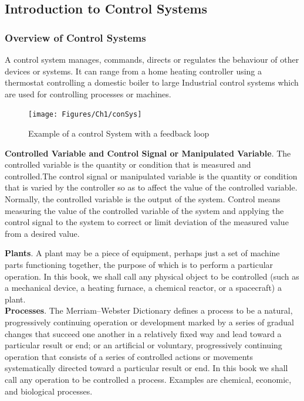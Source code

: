 \documentclass{beamer}
\begin{document}

\subsection{Introduction to Control Systems}
\begin{frame}[allowframebreaks]
\frametitle{Overview of Control Systems}
A control system manages, commands, directs or regulates the behaviour of other devices or systems. It can range from a home heating controller using a thermostat controlling a domestic boiler to large Industrial control systems which are used for controlling processes or machines.
\begin{figure}
	\centering
	\texttt{[image: Figures/Ch1/conSys]}
	\caption{Example of a control System with a feedback loop}
	\label{fig:consys}
\end{figure}

\textbf{Controlled Variable and Control Signal or Manipulated Variable}. The controlled
variable is the quantity or condition that is measured and controlled.The control signal
or manipulated variable is the quantity or condition that is varied by the controller so
as to affect the value of the controlled variable. Normally, the controlled variable is the
output of the system. Control means measuring the value of the controlled variable of
the system and applying the control signal to the system to correct or limit deviation of
the measured value from a desired value. \\
\hfill \newline

\textbf{Plants}. A plant may be a piece of equipment, perhaps just a set of machine parts
functioning together, the purpose of which is to perform a particular operation. In this
book, we shall call any physical object to be controlled (such as a mechanical device, a
heating furnace, a chemical reactor, or a spacecraft) a plant. \\ 

\hfill \newline
\textbf{Processes}. The Merriam–Webster Dictionary defines a process to be a natural, progressively continuing operation or development marked by a series of gradual changes
that succeed one another in a relatively fixed way and lead toward a particular result or
end; or an artificial or voluntary, progressively continuing operation that consists of a series of controlled actions or movements systematically directed toward a particular result or end. In this book we shall call any operation to be controlled a process. Examples
are chemical, economic, and biological processes.


\end{frame}
\end{document}
